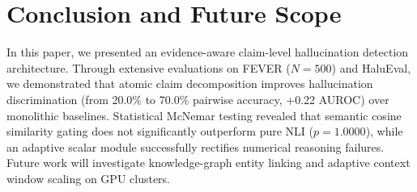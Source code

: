 \documentclass[conference]{IEEEtran}
\begin{document}
\section{Conclusion and Future Scope}
In this paper, we presented an evidence-aware claim-level hallucination detection architecture. Through extensive evaluations on FEVER ($N=500$) and HaluEval, we demonstrated that atomic claim decomposition improves hallucination discrimination (from 20.0\% to 70.0\% pairwise accuracy, +0.22 AUROC) over monolithic baselines. Statistical McNemar testing revealed that semantic cosine similarity gating does not significantly outperform pure NLI ($p=1.0000$), while an adaptive scalar module successfully rectifies numerical reasoning failures. Future work will investigate knowledge-graph entity linking and adaptive context window scaling on GPU clusters.
\end{document}
